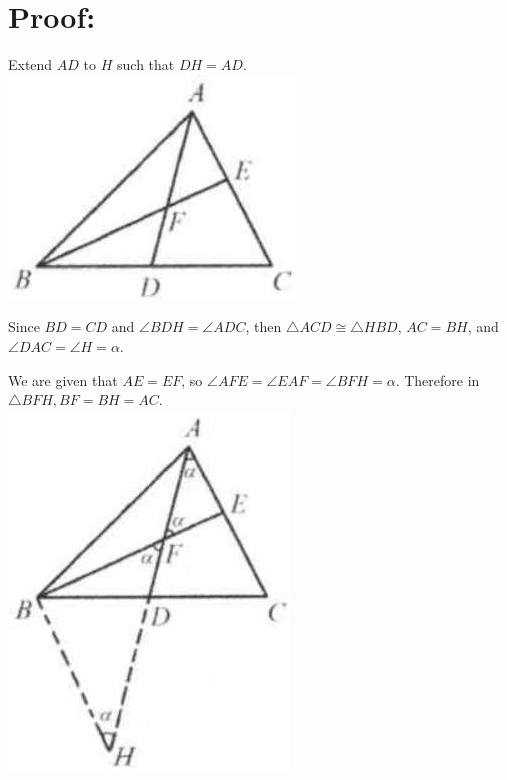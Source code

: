 \documentclass[10pt]{article}
\begin{document}
\section*{Proof:}
Extend \(A D\) to \(H\) such that \(D H=A D\).\\
\includegraphics[max width=\textwidth, center]{2025_04_17_97bc1f7e44d93c271a88g-026}

Since \(B D=C D\) and \(\angle B D H=\angle A D C\), then \(\triangle A C D \cong \triangle H B D\), \(A C=B H\), and \(\angle D A C=\angle H=\alpha\).

We are given that \(A E=E F\), so \(\angle A F E=\angle E A F=\angle B F H=\alpha\). Therefore in \(\triangle B F H, B F=B H=A C\).\\
\includegraphics[max width=\textwidth, center]{2025_04_17_97bc1f7e44d93c271a88g-026(1)}
\end{document}
